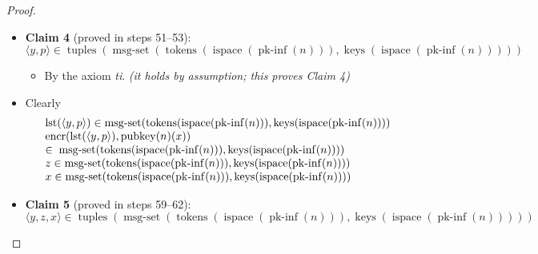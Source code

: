 \documentclass[11pt]{article}
\theoremstyle{plain}
\begin{document}
\begin{proof}
\begin{itemize}[leftmargin=2.8em, itemsep=4pt, parsep=1pt]
  \item[\textbf{50}] \textbf{Claim 4} (proved in steps 51--53):
\begin{equation*}
\langle y, p \rangle \in \operatorname{tuples}(\operatorname{msg\text{-}set}(\operatorname{tokens}(\operatorname{ispace}(\operatorname{pk\text{-}inf}(n))), \operatorname{keys}(\operatorname{ispace}(\operatorname{pk\text{-}inf}(n)))))
\end{equation*}

  \begin{itemize}[leftmargin=2.8em, itemsep=4pt, parsep=1pt]
  \item[\textbf{51--53}] By the axiom \emph{ti}.  \emph{(it holds by assumption; this proves Claim 4)}
  \end{itemize}
  \item[\textbf{54--57}] Clearly
\begin{equation*}
\begin{array}{@{}l@{}}
\operatorname{lst}(\langle y, p \rangle) \in \operatorname{msg\text{-}set}(\operatorname{tokens}(\operatorname{ispace}(\operatorname{pk\text{-}inf}(n))), \operatorname{keys}(\operatorname{ispace}(\operatorname{pk\text{-}inf}(n)))) \\
\begin{array}{@{}l@{}} \operatorname{encr}(\operatorname{lst}(\langle y, p \rangle), \operatorname{pubkey}(n)(x)) \\ \in\; \operatorname{msg\text{-}set}(\operatorname{tokens}(\operatorname{ispace}(\operatorname{pk\text{-}inf}(n))), \operatorname{keys}(\operatorname{ispace}(\operatorname{pk\text{-}inf}(n)))) \end{array} \\
z \in \operatorname{msg\text{-}set}(\operatorname{tokens}(\operatorname{ispace}(\operatorname{pk\text{-}inf}(n))), \operatorname{keys}(\operatorname{ispace}(\operatorname{pk\text{-}inf}(n)))) \\
x \in \operatorname{msg\text{-}set}(\operatorname{tokens}(\operatorname{ispace}(\operatorname{pk\text{-}inf}(n))), \operatorname{keys}(\operatorname{ispace}(\operatorname{pk\text{-}inf}(n))))
\end{array}
\end{equation*}

  \item[\textbf{58}] \textbf{Claim 5} (proved in steps 59--62):
\begin{equation*}
\langle y, z, x \rangle \in \operatorname{tuples}(\operatorname{msg\text{-}set}(\operatorname{tokens}(\operatorname{ispace}(\operatorname{pk\text{-}inf}(n))), \operatorname{keys}(\operatorname{ispace}(\operatorname{pk\text{-}inf}(n)))))
\end{equation*}


\end{itemize}
\end{proof}
\end{document}
